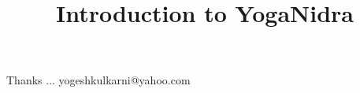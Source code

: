 \documentclass[xcolor=dvipsnames,compress,t,pdf,9pt]{beamer}
\title[\insertframenumber /\inserttotalframenumber]{Introduction to YogaNidra}
\begin{document}
	\begin{frame}
	\titlepage
	\end{frame}
	
	
	
	\begin{frame}[c]{}
	Thanks ...
	\vspace{5mm}
	yogeshkulkarni@yahoo.com
	\end{frame}
\end{document}
